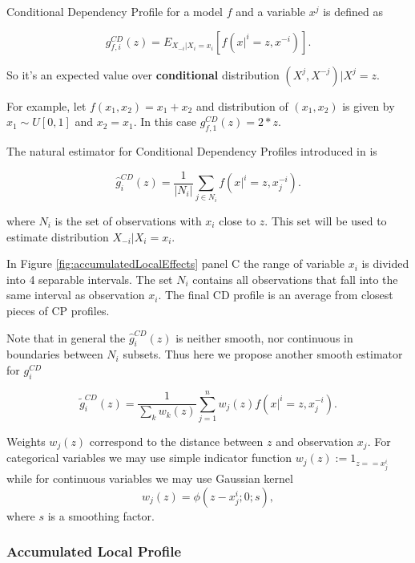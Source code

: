 \documentclass[12pt,]{krantz}
\begin{document}
Conditional Dependency Profile for a model \(f\) and a variable \(x^j\) is defined as

\begin{equation}
g^{CD}_{f, i}(z) = E_{X_{-i}|X_i=x_i}[ f(x|^i = z, x^{-i}) ].
\label{eq:CDPdef}
\end{equation}

So it's an expected value over \textbf{conditional} distribution \((X^j,X^{-j})|X^j=z\).

For example, let \(f(x_1, x_2) = x_1 + x_2\) and distribution of \((x_1, x_2)\) is given by \(x_1 \sim U[0,1]\) and \(x_2=x_1\). In this case \(g^{CD}_{f, 1}(z) = 2*z\).

The natural estimator for Conditional Dependency Profiles introduced in \citep{ALEPlotRPackage} is

\begin{equation}
\hat g^{CD}_i(z) = \frac{1}{|N_i|} \sum_{j\in N_i} f(x|^i = z, x_j^{-i}). 
\label{eq:CDPest}
\end{equation}

where \(N_i\) is the set of observations with \(x_i\) close to \(z\). This set will be used to estimate distribution \(X_{-i}|X_i=x_i\).

In Figure \ref{fig:accumulatedLocalEffects} panel C the range of variable \(x_i\) is divided into 4 separable intervals. The set \(N_i\) contains all observations that fall into the same interval as observation \(x_i\). The final CD profile is an average from closest pieces of CP profiles.

Note that in general the \(\hat g^{CD}_i(z)\) is neither smooth, nor continuous in boundaries between \(N_i\) subsets. Thus here we propose another smooth estimator for \(g_i^{CD}\)

\begin{equation}
\tilde g^{CD}_i(z) = \frac{1}{\sum_k w_{k}(z)} \sum_{j = 1}^n w_j(z) f(x|^i = z, x_j^{-i}) . 
\label{eq:CDPest2}
\end{equation}

Weights \(w_j(z)\) correspond to the distance between \(z\) and observation \(x_j\). For categorical variables we may use simple indicator function \(w_j(z) := 1_{z == x^i_j}\) while for continuous variables we may use Gaussian kernel
\[
w_j(z) = \phi(z - x_j^i; 0; s),
\]
where \(s\) is a smoothing factor.

\hypertarget{accumulated-local-profile}{%
\subsubsection{Accumulated Local Profile}\label{accumulated-local-profile}}
\end{document}
